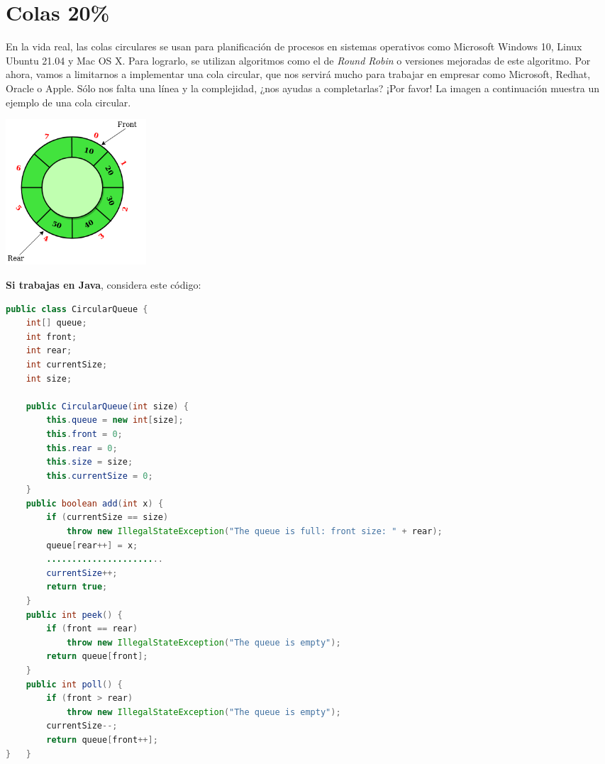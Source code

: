 \documentclass[10 pt]{article}
\begin{document}
\section{Colas 20\%}
\begin{multicols}{2}
En la vida real, las colas circulares se usan para planificación de procesos en sistemas operativos como 
Microsoft Windows 10, Linux Ubuntu 21.04 y Mac OS X. Para lograrlo, se utilizan algoritmos como el de 
\textit{Round Robin} o versiones mejoradas de este algoritmo. Por ahora, vamos a limitarnos a implementar
una cola circular, que nos servirá mucho para trabajar en empresar como Microsoft, Redhat, Oracle o Apple.
Sólo nos falta una línea y la complejidad, ¿nos ayudas a completarlas? ¡Por favor! La imagen a continuación
muestra un ejemplo de una cola circular.



\includegraphics[width=0.23\textwidth]{Circular-queue.png}


\end{multicols}

\textbf{Si trabajas en Java}, considera este código:


\begin{lstlisting}[language = java]
public class CircularQueue {
    int[] queue; 
    int front;
    int rear; 
    int currentSize;
    int size;

    public CircularQueue(int size) { 
        this.queue = new int[size];
        this.front = 0;
        this.rear = 0;
        this.size = size;
        this.currentSize = 0;
    }
    public boolean add(int x) {
        if (currentSize == size) 
            throw new IllegalStateException("The queue is full: front size: " + rear); 
        queue[rear++] = x;
        .......................
        currentSize++;
        return true;
    }
    public int peek() {
        if (front == rear) 
            throw new IllegalStateException("The queue is empty");
        return queue[front];
    }
    public int poll() {
        if (front > rear) 
            throw new IllegalStateException("The queue is empty");
        currentSize--;
        return queue[front++];
}   }
\end{lstlisting}
\end{document}
